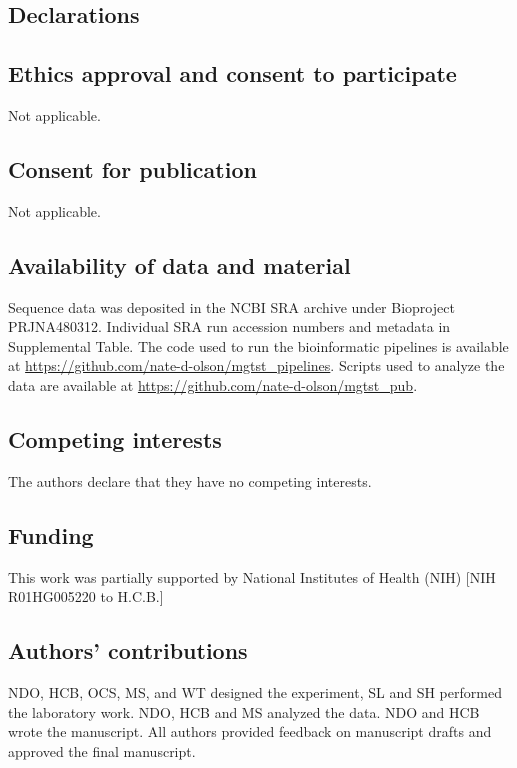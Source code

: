 \documentclass[linenumbers]{bmcart}
\begin{document}
\begin{backmatter}

\section*{Declarations}

\subsection*{Ethics approval and consent to participate}
Not applicable.

\subsection*{Consent for publication}
Not applicable.

\subsection*{Availability of data and material}
Sequence data was deposited in the NCBI SRA archive under Bioproject
PRJNA480312.
Individual SRA run accession numbers and metadata in Supplemental Table.
The code used to run the bioinformatic pipelines is available at
\url{https://github.com/nate-d-olson/mgtst_pipelines}.
Scripts used to analyze the data are available at
\url{https://github.com/nate-d-olson/mgtst_pub}.

\subsection*{Competing interests}
The authors declare that they have no competing interests.

\subsection*{Funding}
This work was partially supported by National Institutes of Health (NIH)
{[}NIH R01HG005220 to H.C.B.{]}

\subsection*{Authors' contributions}
NDO, HCB, OCS, MS, and WT designed the experiment, SL and SH performed the laboratory work.
NDO, HCB and MS analyzed the data.
NDO and HCB wrote the manuscript.
All authors provided feedback on manuscript drafts and approved the final manuscript.



\end{backmatter}
\end{document}
